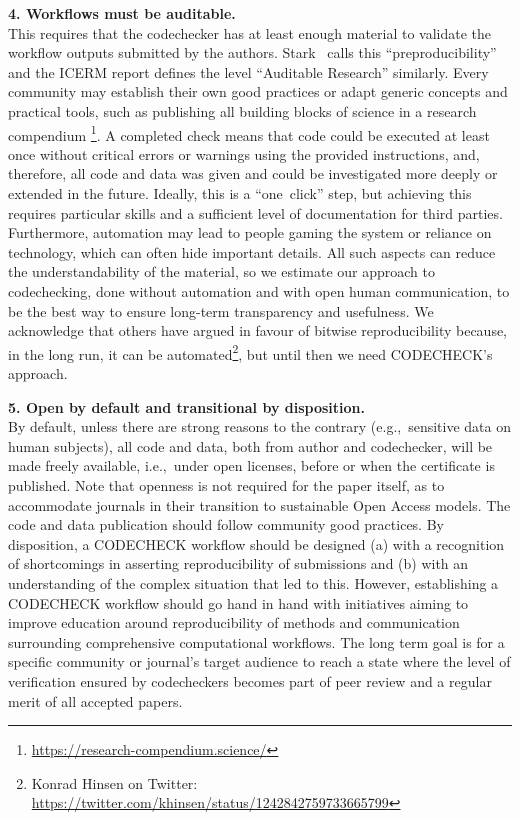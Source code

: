 \documentclass[12pt]{article}
\begin{document}
\textbf{4. Workflows must be auditable.} \\ 
This requires that the codechecker 
has at least enough material to validate the workflow outputs submitted by 
the authors. Stark~\cite{stark_before_2018} calls this ``preproducibility''
and the ICERM report \cite{stodden_setting_2013} defines the level
``Auditable Research'' similarly.
Every community may establish their own good practices or adapt generic
concepts and practical tools, such as publishing all building blocks
of science in a research compendium
\footnote{\url{https://research-compendium.science/}}.
A completed check means that code could be executed at least once without
critical errors or
warnings using the provided instructions, and, therefore, all code and data 
was given and could be investigated more deeply or extended in the future.
Ideally, this is a ``one~click'' step, but achieving this requires particular 
skills and a sufficient level of documentation for 
third parties. Furthermore, automation may lead to people gaming the system
or reliance on technology, which can often hide important details.
All such aspects can reduce the understandability of the material, so we estimate our approach to codechecking, done without automation and with open human communication, to be the best way to ensure long-term transparency and usefulness.
We acknowledge that others have argued in favour of bitwise reproducibility
because, in the long run, it can be automated\footnote{Konrad Hinsen on 
Twitter: \url{https://twitter.com/khinsen/status/1242842759733665799}},
but until then we need CODECHECK's approach.

\textbf{5. Open by default and transitional by disposition.} \\ 
By default, unless there are strong
reasons to the contrary (e.g.,~sensitive data on human subjects), all code and
data, both from author and codechecker, will be made freely available, 
i.e.,~under open licenses, before or when the certificate is published.
Note that openness is not required for the paper itself, as to accommodate 
journals in their transition to sustainable Open Access models.
The code and data publication should follow community good practices.
By disposition, a CODECHECK workflow should be designed (a) with a recognition of
shortcomings in asserting reproducibility of submissions and (b)
with an understanding of the
complex situation that led to this. However, establishing a CODECHECK workflow
should go hand in hand with initiatives aiming to improve education
around reproducibility of methods and communication surrounding comprehensive 
computational workflows.
The long term goal is for a specific community or
journal's target audience to reach a state where the level of verification 
ensured by codecheckers becomes part of peer review and a regular
merit of all accepted papers.
\end{document}

